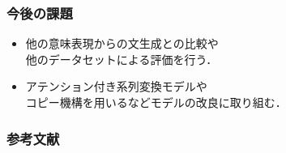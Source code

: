 \documentclass[dvipdfmx,cjk]{beamer}
\begin{document}
\begin{frame}
\frametitle{今後の課題}
\begin{itemize}
\item 他の意味表現からの文生成との比較や\\他のデータセットによる評価を行う．
\item アテンション付き系列変換モデルや\\コピー機構を用いるなどモデルの改良に取り組む．
\end{itemize}

\end{frame}

\begin{frame}
\frametitle{参考文献}



\end{frame}


\begin{thebibliography}{longest label text}
\end{thebibliography}
\end{document}
